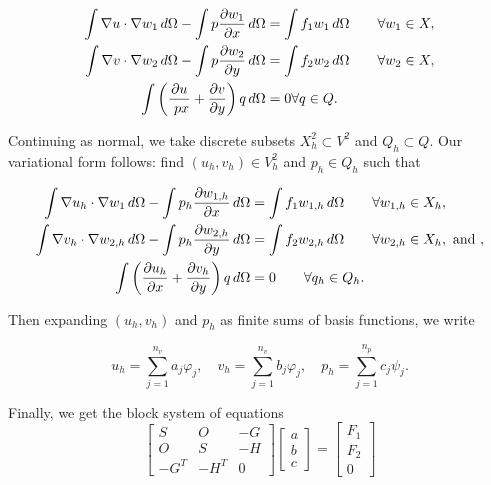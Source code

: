 \documentclass[12pt]{article}
\begin{document}
\begin{equation}
    \begin{split}
        \int \nabla u \cdot \nabla w_1 \,d\Omega - \int p \frac{\partial w_1}{\partial x}
        \,d\Omega &= \int f_1 w_1 \,d\Omega \qquad \forall w_1 \in X, \\
        \int \nabla v \cdot \nabla w_2 \,d\Omega - \int p \frac{\partial w_2}{\partial y}
        \,d\Omega &= \int f_2 w_2 \,d\Omega  \qquad \forall w_2 \in X, \\
        \int \left( \frac{\partial u}{\ px} + \frac{\partial v}{\partial y} \right) q\,d\Omega &=
        0 \forall q \in Q.
    \end{split}
\end{equation}

Continuing as normal, we take discrete subsets $X_h^2 \subset V^2$ and $Q_h
\subset Q$.  Our variational form follows: find $(u_h, v_h) \in V_h^2$ and $p_h
\in Q_h$ such that

\begin{equation}
    \begin{split}
        \int \nabla u_h \cdot \nabla w_1 \,d\Omega - \int p_h \frac{\partial w_{1,h}}{\partial
        x} \,d\Omega &=
        \int f_1 w_{1,h} \,d\Omega \qquad \forall w_{1,h} \in X_h, \\
        \int \nabla v_h \cdot \nabla w_{2,h} \,d\Omega -
        \int p_h \frac{\partial w_{2,h}}{\partial y} \,d\Omega &=
        \int f_2 w_{2,h} \,d\Omega \qquad \forall w_{2,h} \in X_h,
        \text{ and }, \\
        \int \left(\frac{\partial u_h}{\partial x} + \frac{\partial v_h}{\partial y}\right)
        q \,d\Omega &= 0 \qquad \forall q_h \in Q_h.
    \end{split}
\end{equation}

Then expanding $(u_h, v_h)$ and $p_h$ as finite sums of basis functions, we
write

\begin{equation}
    u_h = \sum_{j=1}^{n_v} a_{j} \varphi_j, \quad
    v_h = \sum_{j=1}^{n_v} b_{j} \varphi_j, \quad
    p_h = \sum_{j=1}^{n_p} c_j \psi_j.
\end{equation}

Finally, we get the block system of equations
\begin{equation}
    \begin{bmatrix}
        S & O & -G\\
        O & S & -H \\
        -G^T & -H^T & 0
    \end{bmatrix}
    \begin{bmatrix}
        a \\ b \\ c
    \end{bmatrix} =
    \begin{bmatrix}
        F_1 \\
        F_2 \\
        0
    \end{bmatrix}
\end{equation}
\end{document}
